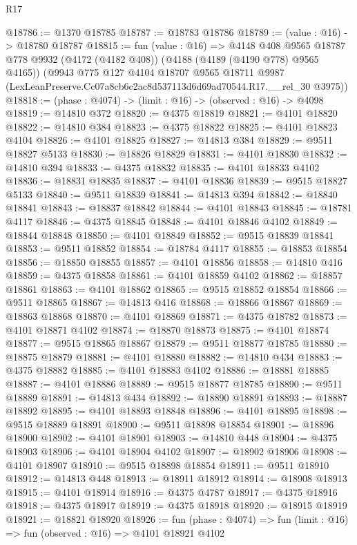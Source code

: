 \begin{lexlean}{R17}
\begin{coremodule}
@18786 := @1370 @18785
@18787 := @18783 @18786
@18789 := (value : @16) -> @18780 @18787
@18815 := fun (value : @16) =>
  @4148
    @408
    @9565
    @18787
    @778
    @9932
    (@4172 (@4182 @408))
    (@4188 (@4189 (@4190 @778) @9565 @4165))
    (@9943
      @775
      @127
      @4104
      @18707
      @9565
      @18711
      @9987
      (LexLeanPreserve.Cc07a8cb6c2ac8d537113d6d69ad70544.R17.__rel_30 @3975))
@18818 := (phase : @4074) -> (limit : @16) -> (observed : @16) -> @4098
@18819 := @14810 @372
@18820 := @4375 @18819
@18821 := @4101 @18820
@18822 := @14810 @384
@18823 := @4375 @18822
@18825 := @4101 @18823 @4104
@18826 := @4101 @18825
@18827 := @14813 @384
@18829 := @9511 @18827 @5133
@18830 := @18826 @18829
@18831 := @4101 @18830
@18832 := @14810 @394
@18833 := @4375 @18832
@18835 := @4101 @18833 @4102
@18836 := @18831 @18835
@18837 := @4101 @18836
@18839 := @9515 @18827 @5133
@18840 := @9511 @18839
@18841 := @14813 @394
@18842 := @18840 @18841
@18843 := @18837 @18842
@18844 := @4101 @18843
@18845 := @18781 @4117
@18846 := @4375 @18845
@18848 := @4101 @18846 @4102
@18849 := @18844 @18848
@18850 := @4101 @18849
@18852 := @9515 @18839 @18841
@18853 := @9511 @18852
@18854 := @18784 @4117
@18855 := @18853 @18854
@18856 := @18850 @18855
@18857 := @4101 @18856
@18858 := @14810 @416
@18859 := @4375 @18858
@18861 := @4101 @18859 @4102
@18862 := @18857 @18861
@18863 := @4101 @18862
@18865 := @9515 @18852 @18854
@18866 := @9511 @18865
@18867 := @14813 @416
@18868 := @18866 @18867
@18869 := @18863 @18868
@18870 := @4101 @18869
@18871 := @4375 @18782
@18873 := @4101 @18871 @4102
@18874 := @18870 @18873
@18875 := @4101 @18874
@18877 := @9515 @18865 @18867
@18879 := @9511 @18877 @18785
@18880 := @18875 @18879
@18881 := @4101 @18880
@18882 := @14810 @434
@18883 := @4375 @18882
@18885 := @4101 @18883 @4102
@18886 := @18881 @18885
@18887 := @4101 @18886
@18889 := @9515 @18877 @18785
@18890 := @9511 @18889
@18891 := @14813 @434
@18892 := @18890 @18891
@18893 := @18887 @18892
@18895 := @4101 @18893 @18848
@18896 := @4101 @18895
@18898 := @9515 @18889 @18891
@18900 := @9511 @18898 @18854
@18901 := @18896 @18900
@18902 := @4101 @18901
@18903 := @14810 @448
@18904 := @4375 @18903
@18906 := @4101 @18904 @4102
@18907 := @18902 @18906
@18908 := @4101 @18907
@18910 := @9515 @18898 @18854
@18911 := @9511 @18910
@18912 := @14813 @448
@18913 := @18911 @18912
@18914 := @18908 @18913
@18915 := @4101 @18914
@18916 := @4375 @4787
@18917 := @4375 @18916
@18918 := @4375 @18917
@18919 := @4375 @18918
@18920 := @18915 @18919
@18921 := @18821 @18920
@18926 := fun (phase : @4074) => fun (limit : @16) => fun (observed : @16) => @4101 @18921 @4102

\end{coremodule}
\end{lexlean}
